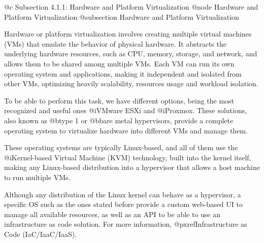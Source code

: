 @c Subsection 4.1.1: Hardware and Platform Virtualization
@node Hardware and Platform Virtualization
@subsection Hardware and Platform Virtualization

Hardware or platform virtualization involves creating multiple virtual machines (VMs) that emulate the behavior of physical hardware. It abstracts the underlying hardware resources, such as CPU, memory, storage, and network, and allows them to be shared among multiple VMs. Each VM can run its own operating system and applications, making it independent and isolated from other VMs, optimizing heavily scalability, resources usage and workload isolation.

To be able to perform this task, we have different options, being the most recognized and useful ones @i{VMware ESXi} and @i{Proxmox}. These solutions, also known as @b{type 1} or @b{bare metal hypervisors}, provide a complete operating system to virtualize hardware into different VMs and manage them. 

These operating systems are typically Linux-based, and all of them use the @i{Kernel-based Virtual Machine (KVM)} technology, built into the kernel itself, making any Linux-based distribution into a hypervisor that allows a host machine to run multiple VMs.

Although any distribution of the Linux kernel can behave as a hypervisor, a specific OS such as the ones stated before provide a custom web-based UI to manage all available resources, as well as an API to be able to use an infrastructure as code solution. For more information, @pxref{Infrastructure as Code (IaC/IaaC/IaaS)}.
